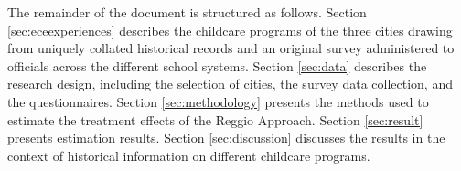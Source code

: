 The remainder of the document is structured as follows. Section \ref{sec:eceexperiences} describes the childcare programs of the three cities drawing from uniquely collated historical records and an original survey administered to officials across the different school systems. Section \ref{sec:data} describes the research design, including the selection of cities, the survey data collection, and the questionnaires. Section \ref{sec:methodology} presents the methods used to estimate the treatment effects of the Reggio Approach. Section \ref{sec:result} presents estimation results. Section \ref{sec:discussion} discusses the results in the context of historical information on different childcare programs. 

